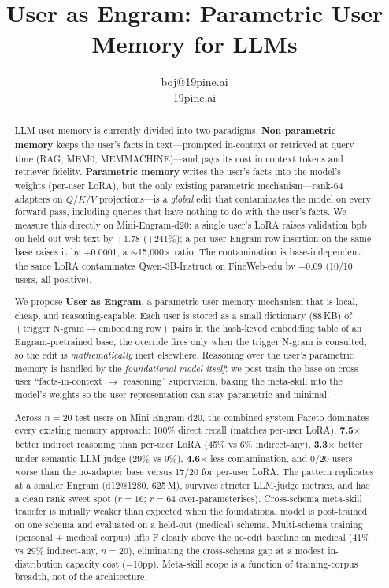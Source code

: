 \documentclass{article}
\title{User as Engram: Parametric User Memory for LLMs}
\author{%
  boj@19pine.ai \\
  19pine.ai
}
\begin{document}
\maketitle


\begin{abstract}
LLM user memory is currently divided into two paradigms.
\textbf{Non-parametric memory} keeps the user's facts in text—prompted
in-context or retrieved at query time (RAG, MEM0, MEMMACHINE)—and pays
its cost in context tokens and retriever fidelity. \textbf{Parametric
memory} writes the user's facts into the model's weights (per-user
LoRA), but the only existing parametric mechanism—rank-64 adapters on
$Q/K/V$ projections—is a \emph{global} edit that contaminates the model
on every forward pass, including queries that have nothing to do with
the user's facts. We measure this directly on Mini-Engram-d20: a single
user's LoRA raises validation bpb on held-out web text by
\textbf{$+1.78$} ($+241\%$); a per-user Engram-row insertion on the
same base raises it by \textbf{$+0.0001$}, a $\sim$15{,}000$\times$
ratio. The contamination is base-independent: the same LoRA contaminates
Qwen-3B-Instruct on FineWeb-edu by $+0.09$ (10/10 users, all positive).

We propose \textbf{User as Engram}, a parametric user-memory mechanism
that is local, cheap, and reasoning-capable. Each user is stored as a
small dictionary (88\,KB) of $(\text{trigger N-gram} \!\to\!
\text{embedding row})$ pairs in the hash-keyed embedding table of an
Engram-pretrained base; the override fires only when the trigger
N-gram is consulted, so the edit is \emph{mathematically} inert
elsewhere. Reasoning over the user's parametric memory is handled by
the \emph{foundational model itself}: we post-train the base on
cross-user ``facts-in-context $\to$ reasoning'' supervision, baking the
meta-skill into the model's weights so the user representation can
stay parametric and minimal.

Across $n{=}20$ test users on Mini-Engram-d20, the combined system
Pareto-dominates every existing memory approach: 100\% direct recall
(matches per-user LoRA), \textbf{7.5$\times$} better indirect reasoning
than per-user LoRA (45\% vs 6\% indirect-any), \textbf{3.3$\times$}
better under semantic LLM-judge (29\% vs 9\%), \textbf{4.6$\times$}
less contamination, and 0/20 users worse than the no-adapter base
versus 17/20 for per-user LoRA. The pattern replicates at a smaller
Engram (d12@1280, 625\,M), survives stricter LLM-judge metrics, and
has a clean rank sweet spot ($r{=}16$; $r{=}64$ over-parameterises).
Cross-schema meta-skill transfer is initially weaker than expected
when the foundational model is post-trained on one schema and
evaluated on a held-out (medical) schema. Multi-schema training
(personal + medical corpus) lifts F clearly above the no-edit
baseline on medical ($41\%$ vs $29\%$ indirect-any, $n{=}20$),
eliminating the cross-schema gap at a modest in-distribution
capacity cost ($-$10pp). Meta-skill scope is a function of
training-corpus breadth, not of the architecture.


\end{abstract}
\end{document}
